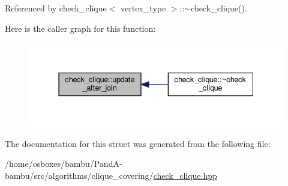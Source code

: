 Referenced by check\+\_\+clique$<$ vertex\+\_\+type $>$\+::$\sim$check\+\_\+clique().

Here is the caller graph for this function\+:
\nopagebreak
\begin{figure}[H]
\begin{center}
\leavevmode
\includegraphics[width=337pt]{d9/d11/structcheck__clique_a9b4bfcf91eab9a68e1b75371ce372515_icgraph}
\end{center}
\end{figure}


The documentation for this struct was generated from the following file\+:\begin{DoxyCompactItemize}
\item 
/home/osboxes/bambu/\+Pand\+A-\/bambu/src/algorithms/clique\+\_\+covering/\hyperlink{check__clique_8hpp}{check\+\_\+clique.\+hpp}\end{DoxyCompactItemize}
